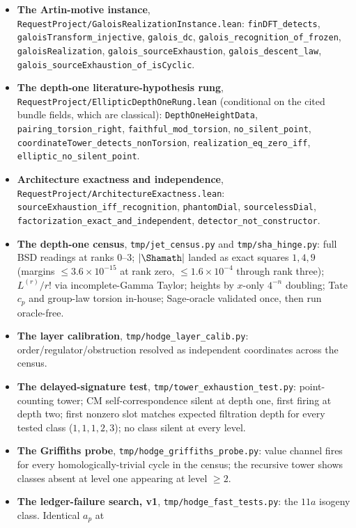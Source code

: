\documentclass[11pt]{article}
\theoremstyle{definition}
\theoremstyle{remark}
\begin{document}
\begin{itemize}
\item \textbf{The Artin-motive instance},
\texttt{RequestProject/GaloisRealizationInstance.lean}:
\texttt{finDFT\_detects}, \texttt{galoisTransform\_injective},
\texttt{galois\_dc}, \texttt{galois\_recognition\_of\_frozen},
\texttt{galoisRealization}, \texttt{galois\_sourceExhaustion},
\texttt{galois\_descent\_law},
\texttt{galois\_sourceExhaustion\_of\_isCyclic}.
\item \textbf{The depth-one literature-hypothesis rung},
\texttt{RequestProject/EllipticDepthOneRung.lean} (conditional on the cited
bundle fields, which are classical):
\texttt{DepthOneHeightData}, \texttt{pairing\_torsion\_right},
\texttt{faithful\_mod\_torsion}, \texttt{no\_silent\_point},
\texttt{coordinateTower\_detects\_nonTorsion},
\texttt{realization\_eq\_zero\_iff},
\texttt{elliptic\_no\_silent\_point}.
\item \textbf{Architecture exactness and independence},
\texttt{RequestProject/ArchitectureExactness.lean}:
\texttt{sourceExhaustion\_iff\_recognition}, \texttt{phantomDial},
\texttt{sourcelessDial}, \texttt{factorization\_exact\_and\_independent},
\texttt{detector\_not\_constructor}.
\item \textbf{The depth-one census}, \texttt{tmp/jet\_census.py} and
\texttt{tmp/sha\_hinge.py}: full BSD readings at ranks $0$--$3$; $|\Shamath|$
landed as exact squares $1,4,9$ (margins $\le3.6\times10^{-15}$ at rank zero,
$\le1.6\times10^{-4}$ through rank three); $L^{(r)}/r!$ via incomplete-Gamma
Taylor; heights by $x$-only $4^{-n}$ doubling; Tate $c_p$ and group-law torsion
in-house; Sage-oracle validated once, then run oracle-free.
\item \textbf{The layer calibration}, \texttt{tmp/hodge\_layer\_calib.py}:
order/regulator/obstruction resolved as independent coordinates across the
census.
\item \textbf{The delayed-signature test},
\texttt{tmp/tower\_exhaustion\_test.py}: point-counting tower; CM
self-correspondence silent at depth one, first firing at depth two; first
nonzero slot matches expected filtration depth for every tested class
($1,1,1,2,3$); no class silent at every level.
\item \textbf{The Griffiths probe}, \texttt{tmp/hodge\_griffiths\_probe.py}:
value channel fires for every homologically-trivial cycle in the census; the
recursive tower shows classes absent at level one appearing at level $\ge2$.
\item \textbf{The ledger-failure search, v1},
\texttt{tmp/hodge\_fast\_tests.py}: the $11a$ isogeny class. Identical $a_p$ at

\end{itemize}
\end{document}
